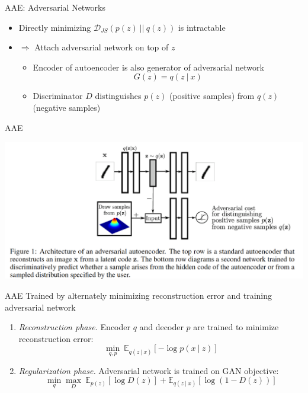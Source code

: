 \documentclass{beamer}
\newcommand{\E}{\mathbb{E}}
\newcommand\given[1][]{\:#1\vert\:}
\begin{document}
\begin{frame}{AAE: Adversarial Networks}
	\begin{itemize}
		\item Directly minimizing $\mathcal{D}_{JS}(p(z) \ \vert\vert \ q(z))$ is intractable
		
		\item $\Rightarrow$ Attach adversarial network on top of $z$
		\begin{itemize}
			\item Encoder of autoencoder is also generator of adversarial network 
			\[G(z) = q(z\given x)\]
			
			\item Discriminator $D$ distinguishes $p(z)$ (positive samples) from $q(z)$ (negative samples)
		\end{itemize}
	\end{itemize}
\end{frame}

\begin{frame}{AAE}
	\begin{center}
		\includegraphics[width=0.9\linewidth]{AAE}
	\end{center}
\end{frame}

\begin{frame}{AAE}
	Trained by alternately minimizing reconstruction error and training adversarial network
	\begin{enumerate}
		\item \textit{Reconstruction phase.} 
		Encoder $q$ and decoder $p$ are trained to minimize reconstruction error:
		\begin{equation}
		\min_{q, p} \ \E_{q(z\given x)} [-\log p(x\given z)]
		\end{equation}
		
		\item \textit{Regularization phase.} 
		Adversarial network is trained on GAN objective:
		\begin{equation*}
		\min_q \max_{D} \ \E_{p(z)} [\log D(z)] + \E_{q(z\given x)} [\log (1 - D(z))] 
		\end{equation*}
		
	\end{enumerate}
\end{frame}
\end{document}
